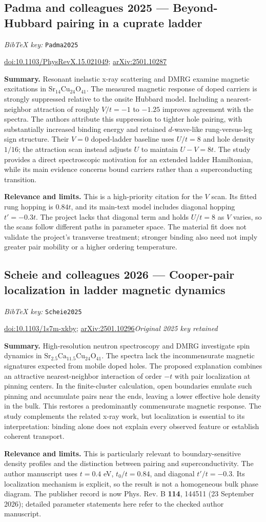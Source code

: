 \documentclass[11pt]{article}
\newcommand{\paper}[2]{\Needspace{8\baselineskip}\subsection{#2}\label{paper:#1}\textit{BibTeX key:} \texttt{#1}\quad\citep{#1}\par}
\newcommand{\doi}[1]{\href{https://doi.org/#1}{doi:#1}}
\newcommand{\arxiv}[1]{\href{https://arxiv.org/abs/#1}{arXiv:#1}}
\newcommand{\summary}{\par\textbf{Summary.} }
\newcommand{\relevance}{\par\textbf{Relevance and limits.} }
\begin{document}
\paper{Padma2025}{Padma and colleagues 2025 --- Beyond-Hubbard pairing in a cuprate ladder}
\doi{10.1103/PhysRevX.15.021049}; \arxiv{2501.10287}
\summary Resonant inelastic x-ray scattering and DMRG examine magnetic excitations in $\mathrm{Sr}_{14}\mathrm{Cu}_{24}\mathrm{O}_{41}$. The measured magnetic response of doped carriers is strongly suppressed relative to the onsite Hubbard model. Including a nearest-neighbor attraction of roughly $V/t=-1$ to $-1.25$ improves agreement with the spectra. The authors attribute this suppression to tighter hole pairing, with substantially increased binding energy and retained $d$-wave-like rung-versus-leg sign structure. Their $V=0$ doped-ladder baseline uses $U/t=8$ and hole density $1/16$; the attraction scan instead adjusts $U$ to maintain $U-V=8t$. The study provides a direct spectroscopic motivation for an extended ladder Hamiltonian, while its main evidence concerns bound carriers rather than a superconducting transition.
\relevance This is a high-priority citation for the $V$ scan. Its fitted rung hopping is $0.84t$, and its main-text model includes diagonal hopping $t'=-0.3t$. The project lacks that diagonal term and holds $U/t=8$ as $V$ varies, so the scans follow different paths in parameter space. The material fit does not validate the project's transverse treatment; stronger binding also need not imply greater pair mobility or a higher ordering temperature.

\paper{Scheie2025}{Scheie and colleagues 2026 --- Cooper-pair localization in ladder magnetic dynamics}
\doi{10.1103/1s7m-xkby}; \arxiv{2501.10296}\quad\textit{Original 2025 key retained}
\summary High-resolution neutron spectroscopy and DMRG investigate spin dynamics in $\mathrm{Sr}_{2.5}\mathrm{Ca}_{11.5}\mathrm{Cu}_{24}\mathrm{O}_{41}$. The spectra lack the incommensurate magnetic signatures expected from mobile doped holes. The proposed explanation combines an attractive nearest-neighbor interaction of order $-t$ with pair localization at pinning centers. In the finite-cluster calculation, open boundaries emulate such pinning and accumulate pairs near the ends, leaving a lower effective hole density in the bulk. This restores a predominantly commensurate magnetic response. The study complements the related x-ray work, but localization is essential to its interpretation: binding alone does not explain every observed feature or establish coherent transport.
\relevance This is particularly relevant to boundary-sensitive density profiles and the distinction between pairing and superconductivity. The author manuscript uses $t=0.4$ eV, $t_0/t=0.84$, and diagonal $t'/t=-0.3$. Its localization mechanism is explicit, so the result is not a homogeneous bulk phase diagram. The publisher record is now Phys. Rev. B \textbf{114}, 144511 (23 September 2026); detailed parameter statements here refer to the checked author manuscript.
\end{document}

